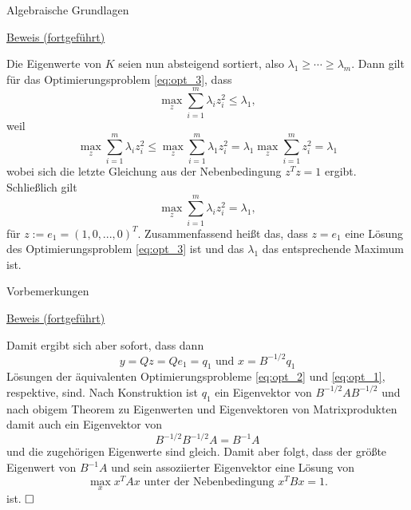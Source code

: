 \documentclass[
  8pt,
  ignorenonframetext,
]{beamer}
\begin{document}
\begin{frame}{Algebraische Grundlagen}
\protect\hypertarget{algebraische-grundlagen-6}{}
\footnotesize

\underline{Beweis (fortgeführt)}

Die Eigenwerte von \(K\) seien nun absteigend sortiert, also
\(\lambda_1 \ge \cdots \ge \lambda_m\). Dann gilt für das
Optimierungsproblem \eqref{eq:opt_3}, dass \begin{equation}
\max_{z} \sum_{i = 1}^m \lambda_i z_i^2 \le \lambda_1,
\end{equation} weil \begin{equation}
\max_{z} \sum_{i = 1}^m \lambda_i z_i^2
\le
\max_{z} \sum_{i = 1}^m \lambda_1 z_i^2
=
\lambda_1 \max_{z} \sum_{i = 1}^m z_i^2
=
\lambda_1
\end{equation} wobei sich die letzte Gleichung aus der Nebenbedingung
\(z^Tz=1\) ergibt. Schließlich gilt \begin{equation}
\max_{z} \sum_{i = 1}^m \lambda_i z_i^2  = \lambda_1,
\end{equation} für \(z := e_1 = (1,0,...,0)^T\). Zusammenfassend heißt
das, dass \(z = e_1\) eine Lösung des Optimierungsproblem
\eqref{eq:opt_3} ist und das \(\lambda_1\) das entsprechende Maximum
ist.
\end{frame}

\begin{frame}{Vorbemerkungen}
\protect\hypertarget{vorbemerkungen}{}
\footnotesize

\underline{Beweis (fortgeführt)}

Damit ergibt sich aber sofort, dass dann \begin{equation}
y = Qz = Qe_1 =  q_1 \mbox{ und } x = B^{-1/2}q_1
\end{equation} Lösungen der äquivalenten Optimierungsprobleme
\eqref{eq:opt_2} und \eqref{eq:opt_1}, respektive, sind. Nach
Konstruktion ist \(q_1\) ein Eigenvektor von \(B^{-1/2}AB^{-1/2}\) und
nach obigem Theorem zu Eigenwerten und Eigenvektoren von Matrixprodukten
damit auch ein Eigenvektor von \begin{equation}
B^{-1/2}B^{-1/2}A = B^{-1}A
\end{equation} und die zugehörigen Eigenwerte sind gleich. Damit aber
folgt, dass der größte Eigenwert von \(B^{-1}A\) und sein assoziierter
Eigenvektor eine Lösung von \begin{equation}
\max_{x} x^TAx \mbox{ unter der Nebenbedingung } x^TBx = 1.
\end{equation} ist. \(\hfill\Box\)
\end{frame}
\end{document}

